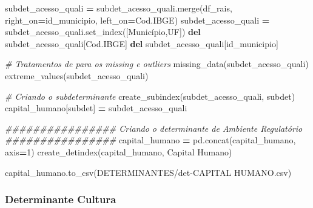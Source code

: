 \documentclass[
  12,
  dvipsnames]{article}
\newenvironment{Shaded}{\begin{snugshade}}{\end{snugshade}}
\newcommand{\CommentTok}[1]{\textcolor[rgb]{0.56,0.35,0.01}{\textit{#1}}}
\newcommand{\DecValTok}[1]{\textcolor[rgb]{0.00,0.00,0.81}{#1}}
\newcommand{\KeywordTok}[1]{\textcolor[rgb]{0.13,0.29,0.53}{\textbf{#1}}}
\newcommand{\NormalTok}[1]{#1}
\newcommand{\OperatorTok}[1]{\textcolor[rgb]{0.81,0.36,0.00}{\textbf{#1}}}
\newcommand{\StringTok}[1]{\textcolor[rgb]{0.31,0.60,0.02}{#1}}
\begin{document}
\begin{Shaded}
\begin{Highlighting}[]
\NormalTok{subdet\_acesso\_quali }\OperatorTok{=}\NormalTok{ subdet\_acesso\_quali.merge(df\_rais, right\_on}\OperatorTok{=}\StringTok{\textquotesingle{}id\_municipio\textquotesingle{}}\NormalTok{,}
\NormalTok{                                                left\_on}\OperatorTok{=}\StringTok{\textquotesingle{}Cod.IBGE\textquotesingle{}}\NormalTok{)}
\NormalTok{subdet\_acesso\_quali }\OperatorTok{=}\NormalTok{ subdet\_acesso\_quali.set\_index([}\StringTok{\textquotesingle{}Município\textquotesingle{}}\NormalTok{,}\StringTok{\textquotesingle{}UF\textquotesingle{}}\NormalTok{])}
\KeywordTok{del}\NormalTok{ subdet\_acesso\_quali[}\StringTok{\textquotesingle{}Cod.IBGE\textquotesingle{}}\NormalTok{]}
\KeywordTok{del}\NormalTok{ subdet\_acesso\_quali[}\StringTok{\textquotesingle{}id\_municipio\textquotesingle{}}\NormalTok{]}

\CommentTok{\# Tratamentos de para os missing e outliers}
\NormalTok{missing\_data(subdet\_acesso\_quali)}
\NormalTok{extreme\_values(subdet\_acesso\_quali)}

\CommentTok{\# Criando o subdeterminante}
\NormalTok{create\_subindex(subdet\_acesso\_quali, subdet)}
\NormalTok{capital\_humano[subdet] }\OperatorTok{=}\NormalTok{ subdet\_acesso\_quali}

\CommentTok{\#\#\#\#\#\#\#\#\#\#\#\#\#\#\#\# Criando o determinante de Ambiente Regulatório \#\#\#\#\#\#\#\#\#\#\#\#\#\#\#\#}
\NormalTok{capital\_humano }\OperatorTok{=}\NormalTok{ pd.concat(capital\_humano, axis}\OperatorTok{=}\DecValTok{1}\NormalTok{)}
\NormalTok{create\_detindex(capital\_humano, }\StringTok{\textquotesingle{}Capital Humano\textquotesingle{}}\NormalTok{)}

\NormalTok{capital\_humano.to\_csv(}\StringTok{\textquotesingle{}DETERMINANTES/det{-}CAPITAL HUMANO.csv\textquotesingle{}}\NormalTok{)}
\end{Highlighting}
\end{Shaded}

\hypertarget{script_2.7}{%
\subsubsection*{Determinante Cultura}\label{script_2.7}}
\end{document}
